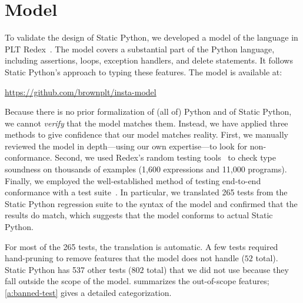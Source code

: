 \documentclass[english,cleveref,submission]{programming}
\newcommand{\SP}{Static Python}
\newcommand{\totalnum}[1]{$#1$ total}
\newcommand{\numSPtest}{265}
\newcommand{\numSPtotal}{802} %
\newcommand{\numSPdiff}{537} %
\begin{document}
\section{Model}
\label{s:model}

To validate the design of \SP{}, we developed a model of the language in PLT
Redex~\cite{kcdeffmrtf-popl-2012}.
The model covers a substantial part of the Python language, including
assertions, loops, exception handlers, and delete statements.
It follows \SP{}'s approach to typing these features.
The model is available at:
\begin{center}
  \url{https://github.com/brownplt/insta-model}
\end{center}
Because there is no prior formalization of (all of) Python and of \SP{}, we cannot
\emph{verify} that the model matches them. Instead, we have applied
three methods to give confidence that our model matches reality.
First, we manually reviewed the model in depth---using our
own expertise---to look for non-conformance.  Second, 
we used Redex's random testing tools~\cite{kf-sfp-2009} to check
type soundness on thousands of examples (1,600 expressions and 11,000
programs).
Finally, we employed the well-established method of testing end-to-end
conformance with a test suite~\cite{gsk-ecoop-2010,gclpk-dls-2012,pmmwplck-oopsla-2013,bcfgmnss-popl-2014,fgpssmds-popl-2016}.
In particular, we translated \numSPtest{} tests from the \SP{} regression suite to the
syntax of the model and confirmed that the results
do match,
which suggests that the model conforms to actual \SP{}.

For most of the \numSPtest{} tests, the translation is automatic.
A few tests required hand-pruning to remove features that the model does not
handle (\totalnum{52}).
\SP{} has \numSPdiff{} other tests (\totalnum{\numSPtotal{}}) that we did not
use because they fall outside the scope of the model.
 summarizes the out-of-scope features; \cref{a:banned-test} gives
a detailed categorization.

\end{document}
